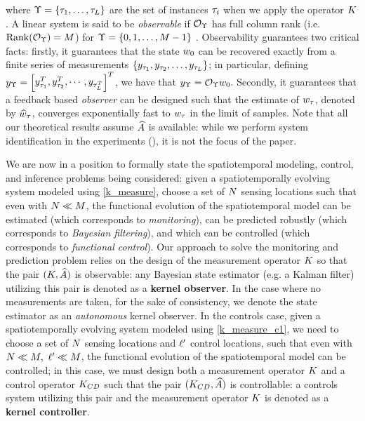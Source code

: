 where $\Upsilon = \{\tau_1, \dots, \tau_{L}\}$ are the set of instances $\tau_i$
when we apply the operator $K$. A linear system is said to be \emph{observable} if $\mathcal{O}_{\Upsilon}$ has full column rank (i.e. $\mathrm{Rank} (\mathcal{O}_{\Upsilon})=M$) for 
$\Upsilon = \{0, 1, \dots, M-1\}$ \cite{zhou:bk:96}. Observability guarantees two critical facts: firstly, it guarantees that the state $w_0$ can be recovered exactly from a finite series of measurements $\{y_{{\tau}_1}, y_{{\tau}_2}, \dots, y_{{\tau}_{L}}\}$; in particular, defining $y_{\Upsilon} = \begin{bmatrix}y_{{\tau}_1}^T, y_{{\tau}_2}^T, \cdots, y_{{\tau}_{L}^T}\end{bmatrix}^T$, we have that $y_{\Upsilon} = \mathcal{O}_{\Upsilon}w_0.$  Secondly, it guarantees that a feedback based \emph{observer} can be designed such that the estimate of $w_{\tau}$, denoted by $\widehat{w}_{\tau}$, converges exponentially fast to $w_{\tau}$ in the limit of samples. Note that all our theoretical results assume $\widehat{A}$ is available: while we perform system identification in the experiments (\cite{Kingravi16_NIPS}), it is not the focus of the paper. 

We are now in a position to formally state the spatiotemporal modeling, control, and inference problems being considered: given a spatiotemporally evolving system modeled using \eqref{k_measure}, choose a set of $N$ sensing locations such that even with $N\ll M$, the functional evolution of the spatiotemporal model can be estimated (which corresponds to \emph{monitoring}), can be predicted robustly (which corresponds to \emph{Bayesian filtering}), and which can be controlled (which corresponds to \emph{functional control}). Our approach to solve the monitoring and prediction problem relies on the design of the measurement operator $K$ so that the pair $(K, \widehat{A})$ is observable: any Bayesian state estimator (e.g. a Kalman filter) utilizing this pair is denoted as a \textbf{kernel observer}. In the case where no measurements are taken, for the sake of consistency, we denote the state estimator as an \textit{autonomous} kernel observer. In the controls case, given a spatiotemporally evolving system modeled using \eqref{k_measure_c1}, we need to choose a set of $N$ sensing locations and $\ell'$ control locations, such that even with $N\ll M, \ \ell' \ll M$, the functional evolution of the spatiotemporal model can be controlled; in this case, we must design both a measurement operator $K$ and a control operator $K_{CD}$ such that the pair $(K_{CD}, \widehat{A})$ is controllable: a controls system utilizing this pair and the measurement operator $K$ is denoted as a \textbf{kernel controller}.


